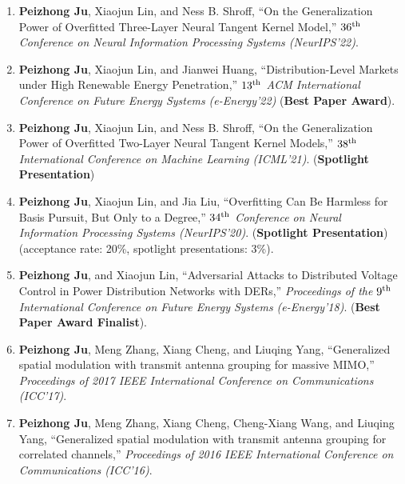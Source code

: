 \documentclass[10pt,letter]{article}
\begin{document}
\begin{small}
\begin{enumerate}
    \item \textbf{Peizhong Ju}, Xiaojun Lin, and Ness B. Shroff, ``On the Generalization Power of Overfitted Three-Layer Neural Tangent Kernel Model,''  \textit{$36\textsuperscript{th}$ Conference on Neural Information Processing Systems (NeurIPS'22)}.
    
    \item \textbf{Peizhong Ju}, Xiaojun Lin, and Jianwei Huang, ``Distribution-Level Markets under High Renewable Energy Penetration,'' \textit{ $13\textsuperscript{th}$ ACM International Conference on Future Energy Systems (e-Energy'22)} (\textbf{Best Paper Award}).
    
    \item \textbf{Peizhong Ju}, Xiaojun Lin, and Ness B. Shroff, ``On the Generalization Power of Overfitted Two-Layer Neural Tangent Kernel Models,'' \textit{$38\textsuperscript{th}$ International Conference on Machine Learning (ICML'21)}. (\textbf{Spotlight Presentation})

    \item \textbf{Peizhong Ju}, Xiaojun Lin, and Jia Liu, ``Overfitting Can Be Harmless for Basis Pursuit, But Only to a Degree,'' \textit{$34\textsuperscript{th}$ Conference on Neural Information Processing Systems (NeurIPS'20)}. (\textbf{Spotlight Presentation}) (acceptance rate: 20\%, spotlight presentations: 3\%).

    \item \textbf{Peizhong Ju}, and Xiaojun Lin, ``Adversarial Attacks to Distributed Voltage Control in Power Distribution Networks with DERs,'' \textit{Proceedings of the $9\textsuperscript{th}$ International Conference on Future Energy Systems (e-Energy'18)}. ({\bf Best Paper Award Finalist}).
    
    \item \textbf{Peizhong Ju}, Meng Zhang, Xiang Cheng, and Liuqing Yang, ``Generalized spatial modulation with transmit antenna grouping for massive MIMO,'' \textit{Proceedings of 2017 IEEE International Conference on Communications (ICC'17)}.
    
    \item \textbf{Peizhong Ju}, Meng Zhang, Xiang Cheng, Cheng-Xiang Wang, and Liuqing Yang, ``Generalized spatial modulation with transmit antenna grouping for correlated channels,'' \textit{Proceedings of 2016 IEEE International Conference on Communications (ICC'16)}.
    

\end{enumerate}
\end{small}
\end{document}
